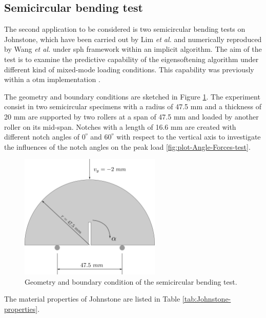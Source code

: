 \documentclass[preprint,12pt,a4paper]{elsarticle}
\begin{document}
\subsection{Semicircular bending test}
\label{sec:3.2}

The second application to be considered is two semicircular
bending tests on Johnstone, which have been carried out by Lim {\it et
  al.} \cite{LIM_1993} and numerically reproduced by Wang {\it et
  al.}\cite{Wang_2020} under \acrshort{sph} framework within an
implicit algorithm. The aim of the test is to examine the predictive
capability of the eigensoftening algorithm under different kind of
mixed-mode loading conditions. This capability was previously within a
\acrshort{otm} implementation \cite{Navas_2018_ES}.

The geometry and boundary conditions are sketched in Figure 
\ref{fig:geometry-Semicircular-bending-test}. The experiment consist in two
semicircular specimens with a radius of 47.5 mm and a thickness of
20 mm are supported by two rollers at a span of 47.5 mm and loaded by
another roller on its mid-span. Notches with a length of 16.6 mm are
created with different notch angles of 0$^º$ and 60$^º$ with respect
to the vertical axis to investigate the influences of the
notch angles on the peak load \ref{fig:plot-Angle-Forces-test}.
\begin{figure}
  \centering
  \includegraphics[width=0.6\textwidth]{./Figure-Semicircular-bending-test}
  \caption{Geometry and boundary condition of the semicircular bending
    test.}
  \label{fig:geometry-Semicircular-bending-test}
\end{figure}
The material properties of Johnstone are listed in Table \ref{tab:Johnstone-properties}.
\end{document}
